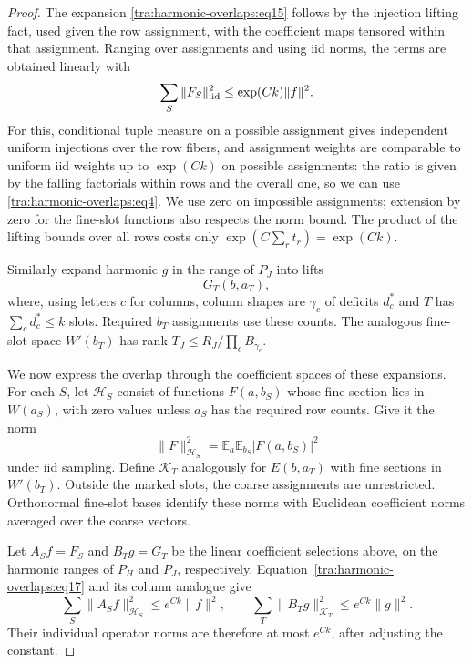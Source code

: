 \begin{proof}
The expansion \eqref{tra:harmonic-overlaps:eq15} follows by the injection lifting fact, used given the row assignment, with the coefficient maps tensored within that assignment. Ranging over assignments and using iid norms, the terms are obtained linearly with
\begin{equation}
                        \sum_S \|F_S\|_{\rm iid}^2
                                     \le \exp(Ck)\|f\|^2.                 \label{tra:harmonic-overlaps:eq17}
\end{equation}
For this, conditional tuple measure on a possible assignment gives independent uniform injections over the row fibers, and assignment weights are comparable to uniform iid weights up to \(\exp(Ck)\) on possible assignments: the ratio is given by the falling factorials within rows and the overall one, so we can use \eqref{tra:harmonic-overlaps:eq4}. We use zero on impossible assignments; extension by zero for the fine-slot functions also respects the norm bound. The product of the lifting bounds over all rows costs only \(\exp(C\sum_r t_r)=\exp(Ck)\).

Similarly expand harmonic \(g\) in the range of \(P_J\) into lifts
\begin{equation}
                                  G_T(b,a_T),                              \label{tra:harmonic-overlaps:eq18}
\end{equation}
where, using letters \(c\) for columns, column shapes are \(\gamma_c\) of deficits \(d_c^*\) and \(T\) has \(\sum_c d_c^*\le k\) slots. Required \(b_T\) assignments use these counts. The analogous fine-slot space \(W'(b_T)\) has rank \(T_J\le R_J/\prod_c B_{\gamma_c}\).

\label{tra:harmonic-overlaps:centering-and-residual-coverage}
We now express the overlap through the coefficient spaces of these expansions. For each \(S\), let \(\mathcal H_S\) consist of functions \(F(a,b_S)\) whose fine section lies in \(W(a_S)\), with zero values unless \(a_S\) has the required row counts. Give it the norm
\[
 \|F\|_{\mathcal H_S}^2
   =\mathbb E_a\mathbb E_{b_S}|F(a,b_S)|^2
\]
under iid sampling. Define \(\mathcal K_T\) analogously for \(E(b,a_T)\) with fine sections in \(W'(b_T)\). Outside the marked slots, the coarse assignments are unrestricted. Orthonormal fine-slot bases identify these norms with Euclidean coefficient norms averaged over the coarse vectors.

Let \(A_Sf=F_S\) and \(B_Tg=G_T\) be the linear coefficient selections above, on the harmonic ranges of \(P_H\) and \(P_J\), respectively. Equation~\eqref{tra:harmonic-overlaps:eq17} and its column analogue give
\[
 \sum_S\|A_Sf\|_{\mathcal H_S}^2\le e^{Ck}\|f\|^2,
 \qquad
 \sum_T\|B_Tg\|_{\mathcal K_T}^2\le e^{Ck}\|g\|^2.
\]
Their individual operator norms are therefore at most \(e^{Ck}\), after adjusting the constant.


\end{proof}
